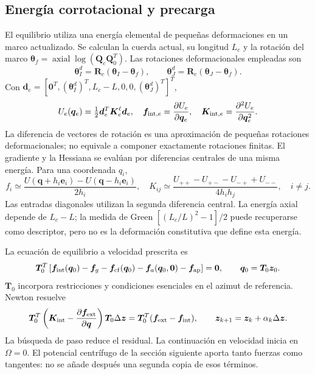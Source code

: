 \documentclass[oneside,a4paper,spanish,links,pagenumbers]{amca}
\begin{document}
\subsection{Energía corrotacional y precarga}
El equilibrio utiliza una energía elemental de pequeñas deformaciones en un marco actualizado. Se calculan la cuerda actual, su longitud $L_c$ y la rotación del marco $\bm\theta_f=\operatorname{axial}\log(\bm Q_c\bm Q_0^T)$. Las rotaciones deformacionales empleadas son
\begin{equation}
\bm\theta_I^d=\bm R_c(\bm\theta_I-\bm\theta_f),
\qquad
\bm\theta_J^d=\bm R_c(\bm\theta_J-\bm\theta_f).
\end{equation}
Con $\bm d_e=[\bm0^T,(\bm\theta_I^d)^T,L_c-L,0,0,(\bm\theta_J^d)^T]^T$,
\begin{equation}
U_e(\bm q_e)=\tfrac12\bm d_e^T\bm K_e^\ell\bm d_e,
\quad \bm f_{{\rm int},e}=\frac{\partial U_e}{\partial\bm q_e},
\quad \bm K_{{\rm int},e}=\frac{\partial^2U_e}{\partial\bm q_e^2}.
\end{equation}
La diferencia de vectores de rotación es una aproximación de pequeñas rotaciones deformacionales; no equivale a componer exactamente rotaciones finitas. El gradiente y la Hessiana se evalúan por diferencias centrales de una misma energía. Para una coordenada $q_i$,
\begin{equation}
f_i\simeq\frac{U(\bm q+h_i\bm e_i)-U(\bm q-h_i\bm e_i)}{2h_i},
\quad
K_{ij}\simeq\frac{U_{++}-U_{+-}-U_{-+}+U_{--}}{4h_ih_j},\quad i\ne j.
\end{equation}
Las entradas diagonales utilizan la segunda diferencia central. La energía axial depende de $L_c-L$; la medida de Green $[(L_c/L)^2-1]/2$ puede recuperarse como descriptor, pero no es la deformación constitutiva que define esta energía.

La ecuación de equilibrio a velocidad prescrita es
\begin{equation}
\bm T_0^T\left[\bm f_{\rm int}(\bm q_0)-\bm f_g
-\bm f_{\rm cf}(\bm q_0)-\bm f_a(\bm q_0,\bm0)-\bm f_{\rm ap}\right]=\bm0,
\qquad \bm q_0=\bm T_0\bm z_0.
\end{equation}
$\bm T_0$ incorpora restricciones y condiciones esenciales en el azimut de referencia. Newton resuelve
\begin{equation}
\bm T_0^T\left(\bm K_{\rm int}-\frac{\partial\bm f_{\rm ext}}{\partial\bm q}\right)
\bm T_0\Delta\bm z
=\bm T_0^T(\bm f_{\rm ext}-\bm f_{\rm int}),
\qquad \bm z_{k+1}=\bm z_k+\alpha_k\Delta\bm z.
\end{equation}
La búsqueda de paso reduce el residual. La continuación en velocidad inicia en $\Omega=0$. El potencial centrífugo de la sección siguiente aporta tanto fuerzas como tangentes: no se añade después una segunda copia de esos términos.
\end{document}
